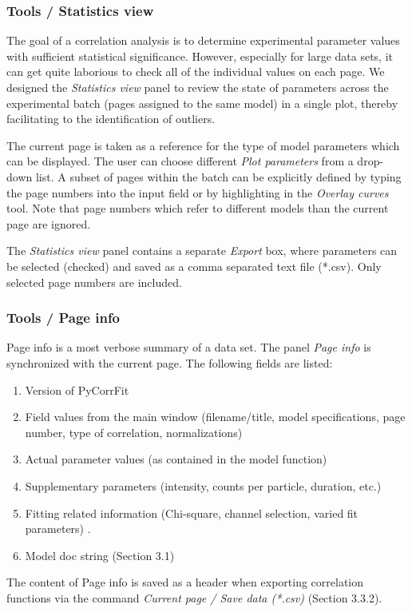 \subsubsection{Tools / Statistics view}

The goal of a correlation analysis is to determine experimental parameter values with sufficient statistical significance. However, especially for large data sets, it can get quite laborious to check all of the individual values on each page. We designed the \textit{Statistics view} panel to review the state of parameters across the experimental batch (pages assigned to the same model) in a single plot, thereby facilitating to the identification of outliers.

The current page is taken as a reference for the type of model parameters which can be displayed. The user can choose different \textit{Plot parameters} from a drop-down list. A subset of pages within the batch can be explicitly defined by typing the page numbers into the input field or by highlighting in the \textit{Overlay curves} tool. Note that page numbers which refer to different models than the current page are ignored. 

The \textit{Statistics view} panel contains a separate \textit{Export} box, where parameters can be selected (checked) and saved as a comma separated text file (*.csv). Only selected page numbers are included.

\subsubsection{Tools / Page info}

Page info is a most verbose summary of a data set. The panel \textit{Page info} is synchronized with the current page. The following fields are listed:


\begin{enumerate}
\item Version of PyCorrFit
\item Field values from the main window (filename/title, model specifications, page number, type of correlation, normalizations)
\item Actual parameter values (as contained in the model function)
\item Supplementary parameters (intensity, counts per particle, duration, etc.)
\item Fitting related information (Chi-square, channel selection, varied fit parameters) .
\item Model doc string (Section 3.1)
\end{enumerate}
The content of Page info is saved as a header when exporting correlation functions via the command \textit{Current page / Save data (*.csv)} (Section 3.3.2).


